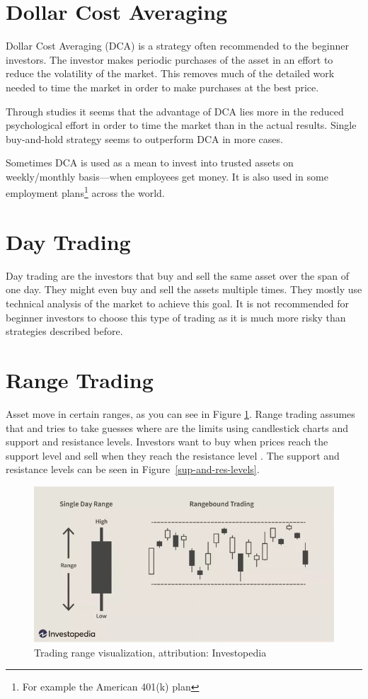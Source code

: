 \section{Dollar Cost Averaging}
Dollar Cost Averaging (DCA) is a strategy often recommended to the beginner investors. The investor makes periodic purchases of the asset in an effort to reduce the volatility of the market. This removes much of the detailed work needed to time the market in order to make purchases at the best price.

Through studies \cite{DCA-study} it seems that the advantage of DCA lies more in the reduced psychological effort in order to time the market than in the actual results. Single buy-and-hold strategy seems to outperform DCA in more cases.

Sometimes DCA is used as a mean to invest into trusted assets on weekly/monthly basis---when employees get money. It is also used in some employment plans\footnote{For example the American 401(k) plan} across the world.

\section{Day Trading}
Day trading are the investors that buy and sell the same asset over the span of one day. They might even buy and sell the assets multiple times. They mostly use technical analysis of the market to achieve this goal. It is not recommended for beginner investors to choose this type of trading as it is much more risky than strategies described before.

\section{Range Trading}
Asset move in certain ranges, as you can see in Figure \ref{trading-range-figure}. Range trading assumes that and tries to take guesses where are the limits using candlestick charts and support and resistance levels. Investors want to buy when prices reach the support level and sell when they reach the resistance level \cite{5types-of-daytrading}. The support and resistance levels can be seen in Figure~\ref{sup-and-res-levels}.

\begin{figure}[ht]
    \centering
    \includegraphics[width=\columnwidth]{figures/trading-range.png}
    \caption{Trading range visualization, attribution: Investopedia \cite{investopedia:trading-range}}
    \label{trading-range-figure}
\end{figure}

